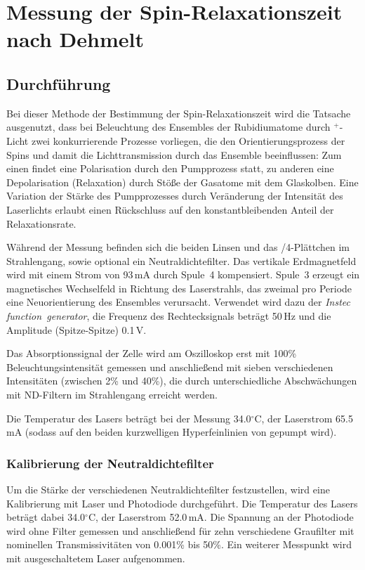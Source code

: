 \section{Messung der Spin-Relaxationszeit nach Dehmelt}
\label{sect:dehmelt}
\subsection{Durchführung}
Bei dieser Methode der Bestimmung der Spin-Relaxationszeit wird die Tatsache ausgenutzt,
dass bei Beleuchtung des Ensembles der Rubidiumatome durch \textsigma$^+$-Licht
zwei konkurrierende Prozesse vorliegen, die den Orientierungsprozess der Spins und damit
die Lichttransmission durch das Ensemble beeinflussen:
Zum einen findet eine Polarisation durch den Pumpprozess statt,
zu anderen eine Depolarisation (Relaxation) durch Stöße der Gasatome mit dem Glaskolben.
Eine Variation der Stärke des Pumpprozesses durch Veränderung der Intensität des Laserlichts
erlaubt einen Rückschluss auf den konstantbleibenden Anteil der Relaxationsrate.

Während der Messung befinden sich die beiden Linsen und das \textlambda/4-Plättchen im Strahlengang,
sowie optional ein Neutraldichtefilter.
Das vertikale Erdmagnetfeld wird mit einem Strom von 93\,mA durch Spule~4 kompensiert.
Spule~3 erzeugt ein magnetisches Wechselfeld in Richtung des Laserstrahls,
das zweimal pro Periode eine Neuorientierung des Ensembles verursacht.
Verwendet wird dazu der \emph{Instec function~generator},
die Frequenz des Rechtecksignals beträgt 50\,Hz und die Amplitude (Spitze-Spitze) 0.1\,V.

Das Absorptionssignal der Zelle wird am Oszilloskop erst mit 100\% Beleuchtungsintensität gemessen
und anschließend mit sieben verschiedenen Intensitäten (zwischen 2\% und 40\%),
die durch unterschiedliche Abschwächungen mit ND-Filtern im Strahlengang erreicht werden.

Die Temperatur des Lasers beträgt bei der Messung 34.0$^\circ$C, der Laserstrom 65.5\,mA
(sodass auf den beiden kurzwelligen Hyperfeinlinien von  gepumpt wird).







\subsubsection*{Kalibrierung der Neutraldichtefilter}
Um die Stärke der verschiedenen Neutraldichtefilter festzustellen,
wird eine Kalibrierung mit Laser und Photodiode durchgeführt.
Die Temperatur des Lasers beträgt dabei 34.0$^\circ$C, der Laserstrom 52.0\,mA.
Die Spannung an der Photodiode wird ohne Filter gemessen und anschließend für zehn verschiedene Graufilter
mit nominellen Transmissivitäten von 0.001\% bis 50\%.
Ein weiterer Messpunkt wird mit ausgeschaltetem Laser aufgenommen.


